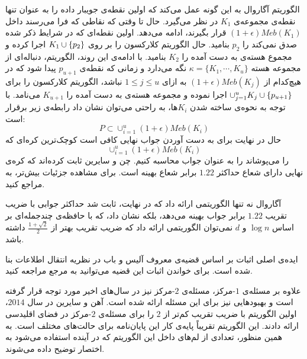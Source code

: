 الگوریتم آگاروال به این گونه عمل می‌کند که اولین نقطه‌ی جویبار داده را به عنوان تنها نقطه‌ی مجموعه‌ی $K_1$ در نظر می‌گیرد.
حال تا وقتی که نقاطی که فرا می‌رسند داخل $(1 + \epsilon)Meb(K_1)$ قرار بگیرند، ادامه می‌دهد.
اولین نقطه‌ای که در شرایط ذکر شده صدق نمی‌کند را $p_2$ بنامید.
حال الگوریتم کلارکسون را بر روی $K_1 \cup \left\{ p_2 \right\}$ اجرا کرده و مجموع هسته‌ی به دست آمده را $K_2$ بنامید.
با ادامه‌ی این روند، الگوریتم، دنباله‌ای از مجموعه هسته $\kappa = \{ K_1, \cdots, K_u \}$ نگه می‌دارد و زمانی که نقطه‌ی $p_{u+1}$ پیدا شود که در هیچ‌کدام از $(1 + \epsilon)Meb(K_j)$ به ازای $1 \leq j \leq u$ نباشد، الگوریتم کلارکسون را برای $\cup_{j = 1}^{u} K_j \cup \left\{ p_{u+1} \right\}$ اجرا نموده و مجموعه هسته‌ی به دست آمده را $K_{u+1}$ می‌نامد.
با توجه به نحوه‌ی ساخته شدن $K_i$ها، به راحتی می‌توان نشان داد رابطه‌ی زیر برقرار است:
$$P \subset \cup_{i=1}^u (1+\epsilon)Meb(K_i)$$
حال در نهایت برای به دست آوردن جواب نهایی کافی است کوچک‌ترین کره‌ای که 
$$\cup_{i=1}^u (1+\epsilon)Meb(K_i)$$
 را می‌پوشاند را به عنوان جواب محاسبه کنیم.
 چن و سایرین ثابت کرده‌اند که کره‌ی نهایی دارای شعاع حداکثر $1.22$ برابر شعاع بهینه است. برای مشاهده‌ جزئیات بیش‌تر، به  مراجع کنید.

آگاروال نه تنها الگوریتمی ارائه داد که در نهایت، ثابت شد حداکثر جوابی با ضریب تقریب $1.22$ برابر جواب بهینه می‌دهد، بلکه نشان داد، که با حافظه‌ی چندجمله‌ای بر اساس $\log{n}$ و $d$ نمی‌توان الگوریتمی ارائه داد که ضریب تقریب بهتر از $\frac{1 + \sqrt{2}}{2}$ داشته باشد.




ایده‌ی اصلی اثبات بر اساس قضیه‌ی معروف آلیس و باب در نظریه انتقال اطلاعات بنا شده است.
برای خواندن اثبات این قضیه می‌توانید به مرجع  مراجعه کنید.


علاوه بر مسئله‌ی $1$-مرکز، مسئله‌ی $2$-مرکز نیز در سال‌های اخیر مورد توجه قرار گرفته است و بهبودهایی نیز برای این مسئله ارائه شده است.
آهن و سایرین  در سال $2014$، اولین الگوریتم با ضریب تقریب کم‌تر از $2$ را برای مسئله‌ی $2$-مرکز در فضای اقلیدسی ارائه دادند.
این الگوریتم تقریباً پایه‌ی کار این پایان‌نامه برای حالت‌های مختلف است.
به همین منظور، تعدادی از لم‌های داخل این الگوریتم که در آینده استفاده می‌شود به اختصار توضیح داده می‌شوند.


